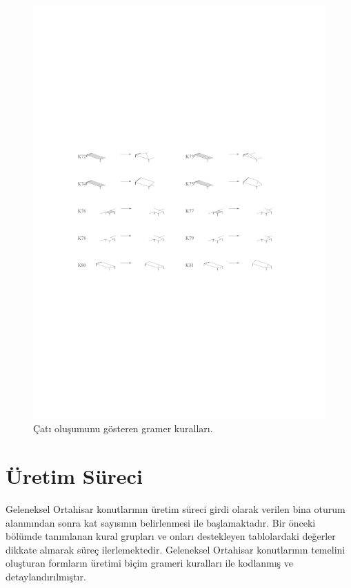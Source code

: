 \documentclass[12pt,turkish,a4paperpaper,]{report}
\begin{document}
\begin{figure}
\centering
\includegraphics[width=1\textwidth,height=\textheight]{source/figures/KCati.pdf}
\caption{Çatı oluşumunu gösteren gramer kuralları. \label{KCati}}
\end{figure}

\hypertarget{uxfcretim-suxfcreci}{%
\section{Üretim Süreci}\label{uxfcretim-suxfcreci}}

Geleneksel Ortahisar konutlarının üretim süreci girdi olarak verilen
bina oturum alanınından sonra kat sayısının belirlenmesi ile
başlamaktadır. Bir önceki bölümde tanımlanan kural grupları ve onları
destekleyen tablolardaki değerler dikkate alınarak süreç ilerlemektedir.
Geleneksel Ortahisar konutlarının temelini oluşturan formların üretimi
biçim grameri kuralları ile kodlanmış ve detaylandırılmıştır.
\end{document}
